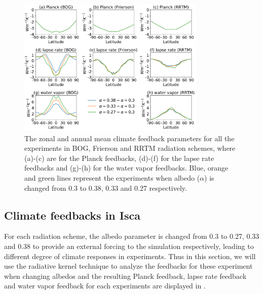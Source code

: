 \begin{figure}[ht]
	\centering
	\includegraphics[width=0.8\textwidth]{figs/polar_amp/all_zonalmean_feedbacks}
	\caption[The zonal and annual mean climate feedback parameters for all the experiments in BOG, Frierson and RRTM radiation schemes]{The zonal and annual mean climate feedback parameters for all the experiments in BOG, Frierson and RRTM radiation schemes, where (a)-(c) are for the Planck feedbacks, (d)-(f) for the lapse rate feedbacks and (g)-(h) for the water vapor feedbacks. Blue, orange and green lines represent the experiments when albedo ($\alpha$) is changed from 0.3 to 0.38, 0.33 and 0.27 respectively.}
	\label{fig:all_feedbacks}
\end{figure}

\subsection{Climate feedbacks in Isca}
For each radiation scheme, the albedo parameter is changed from 0.3 to 0.27, 0.33 and 0.38 to provide an external forcing to the simulation respectively, leading to different degree of climate responses in experiments. Thus in this section, we will use the radiative kernel technique to analyze the feedbacks for these experiment when changing albedos and the resulting Planck feedback, lapse rate feedback and water vapor feedback for each experiments are displayed in .


